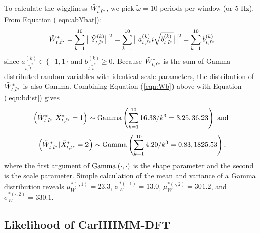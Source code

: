 To calculate the wiggliness $\tilde{W}^*_{t,\tilde t^*}$, we pick $\tilde{\omega} = 10$ periods per window (or 5 Hz). From Equation (\ref{eqn:abYhat}):
%
\begin{equation}
    \Ztwo_{t,\tilde t^*} = \sum_{k=1}^{10} \big|\big|\hat{Y}^{(k)}_{t,\tilde t^*}\big|\big|^2 = \sum_{k=1}^{10} \big|\big|a^{(k)}_{t,\tilde t^*}i\sqrt{b^{(k)}_{t,\tilde t^*}}\big|\big|^2 = \sum_{k=1}^{10} b^{(k)}_{t,\tilde t^*}
    \label{eqn:Wb}
\end{equation}
%
since $a^{(k)}_{t,\tilde t^*} \in \{-1,1\}$ and $b^{(k)}_{t,\tilde t^*} \geq 0$. Because $\tilde{W}^*_{t,\tilde t^*}$ is the sum of Gamma-distributed random variables with identical scale parameters, the distribution of $\tilde{W}^*_{t,\tilde t^*}$ is also Gamma. Combining Equation (\ref{eqn:Wb}) above with Equation (\ref{eqn:bdist}) gives
%
$$\left(\tilde{W}^*_{t,\tilde t^*}|\tilde X^*_{t,\tilde t^*} = 1\right) \sim {\rm{Gamma}}\left(\sum_{k=1}^{10} 16.38/k^3 = 3.25 , 36.23 \right) \text { and }$$
%
$$\left(\tilde{W}^*_{t,\tilde t^*}|\tilde X^*_{t,\tilde t^*} = 2\right) \sim {\rm{Gamma}}\left(\sum_{k=1}^{10} 4.20/k^3 = 0.83 , 1825.53 \right),$$
%
where the first argument of ${\rm{Gamma}}\left(\cdot,\cdot\right)$ is the shape parameter and the second is the scale parameter. Simple calculation of the mean and variance of a Gamma distribution reveals $\mu_W^{*(\cdot,1)} = 23.3$, $\sigma_W^{*(\cdot,1)} = 13.0$, $\mu_W^{*(\cdot,2)} = 301.2$, and $\sigma_W^{*(\cdot,2)} = 330.1$.


\subsection{Likelihood of CarHHMM-DFT}

